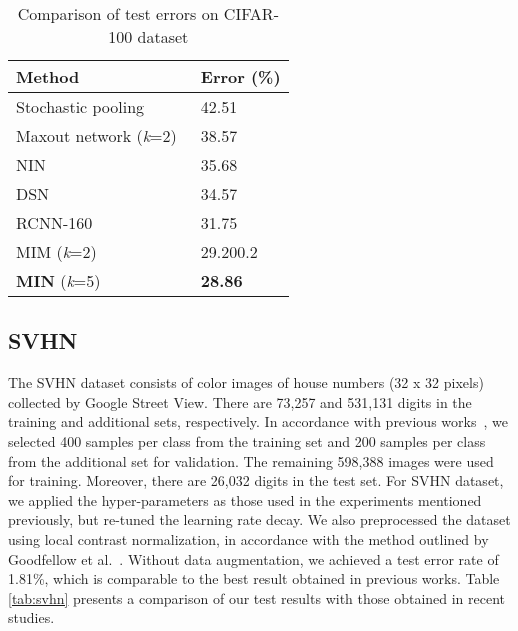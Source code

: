 \documentclass[10pt,twocolumn,letterpaper]{article}
\begin{document}
\begin{table}
\begin{center}
\caption{Comparison of test errors on CIFAR-100 dataset}
\begin{tabular}{|p{1.6in}|p{0.6in}|} \hline 
Method & Error (\%) \\ \hline 
Stochastic pooling~\cite{zeiler2013stochastic} & 42.51 \\ \hline 
Maxout network (\textit{k}=2)~\cite{goodfellow2013maxout} & 38.57 \\ \hline 
NIN~\cite{DBLP:journals/corr/LinCY13} & 35.68 \\ \hline 
DSN~\cite{lee2014deeply} & 34.57 \\ \hline 
RCNN-160~\cite{Liang_2015_CVPR} & 31.75 \\ \hline
MIM (\textit{k}=2)~\cite{liao2015importance} & 29.200.2 \\ \hline 
\textbf{MIN} (\textit{k}=5) & \textbf{28.86} \\ \hline
\end{tabular}
\label{tab:CIFAR100}
\end{center}
\end{table}

\subsection{SVHN}
 The SVHN dataset consists of color images of house numbers (32 x 32 pixels) collected by Google Street View. There are 73,257 and 531,131 digits in the training and additional sets, respectively. In accordance with previous works~\cite{goodfellow2013maxout}, we selected 400 samples per class from the training set and 200 samples per class from the additional set for validation. The remaining 598,388 images were used for training. Moreover, there are 26,032 digits in the test set. For SVHN dataset, we applied the hyper-parameters as those used in the experiments mentioned previously, but re-tuned the learning rate decay. We also preprocessed the dataset using local contrast normalization, in accordance with the method outlined by Goodfellow et al.~\cite{goodfellow2013maxout}. Without data augmentation, we achieved a test error rate of 1.81\%, which is comparable to the best result obtained in previous works. Table \ref{tab:svhn} presents a comparison of our test results with those obtained in recent studies.
\end{document}
